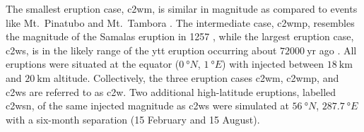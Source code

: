 \documentclass{ametsocV6.1}
\newcommand{\iso}[1][i]{{#1}njected \ce{SO2}}
\begin{document}
The smallest eruption case, \gls{c2wm}, is similar in magnitude as compared to events
like Mt.\ Pinatubo
\citep[\(\sim10\)--\(\SI{20}{\tera\gram(\ce{SO2})}\);][]{timmreck2018} and Mt.\ Tambora
\citep[\(\sim\SI{56.2}{\tera\gram(\ce{SO2})}\);][]{zanchettin2016}. The intermediate
case, \gls{c2wmp}, resembles the magnitude of the Samalas eruption in 1257
\citep[\(\sim{144}\)--\(\SI{170}{\tera\gram(\ce{SO2})}\);][]{vidal2016}, while the
largest eruption case, \gls{c2ws}, is in the likely range of the \gls{ytt} eruption
occurring about \(\SI{72000}{\mathrm{yr}}\) ago
\citep[\(100\)--\(\SI{10000}{\tera\gram(\ce{SO2})}\);][]{jones2005}. All eruptions were
situated at the equator (\(\SI{0}{\degree N}\), \(\SI{1}{\degree E}\)) with 
injected between \(\SI{18}{\kilo\meter}\) and \(\SI{20}{\kilo\meter}\) altitude.
Collectively, the three eruption cases \gls{c2wm}, \gls{c2wmp}, and \gls{c2ws} are
referred to as \gls{c2w}. Two additional high-latitude eruptions, labelled \gls{c2wsn},
of the same \iso{} magnitude as \gls{c2ws} were simulated at \(\SI{56}{\degree N}\),
\(\SI{287.7}{\degree E}\) with a six-month separation (15 February and 15 August).
\end{document}
